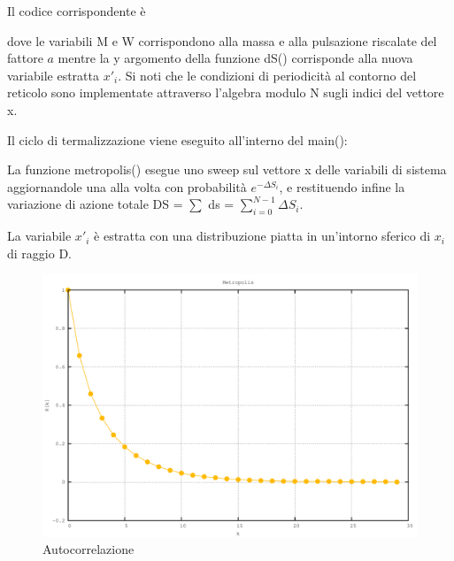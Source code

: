 \documentclass[a4paper,11pt]{report}
\begin{document}
Il codice corrispondente è

dove le variabili {\ttfamily M} e {\ttfamily W} corrispondono alla massa e alla pulsazione riscalate del fattore $a$ mentre la {\ttfamily y} argomento della funzione {\ttfamily dS()} corrisponde alla nuova variabile estratta $x'_{i}$. Si noti che le condizioni di periodicità al contorno del reticolo sono implementate attraverso l'algebra modulo N sugli indici del vettore {\ttfamily x}.

Il ciclo di termalizzazione viene eseguito all'interno del {\ttfamily main()}:

La funzione {\ttfamily metropolis()} esegue uno sweep sul vettore {\ttfamily x} delle variabili di sistema aggiornandole una alla volta con probabilità $e^{-\Delta S_i}$, e restituendo infine la variazione di azione totale {\ttfamily DS} = {\ttfamily $\sum$ ds} = $\sum^{N-1}_{i=0}\Delta S_i$.

La variabile $x'_i$ è estratta con una distribuzione piatta in un'intorno sferico di $x_i$ di raggio {\ttfamily D}.

\begin{figure}[h]
\centering
\includegraphics[width=\textwidth]{autocorrelation}
\caption{Autocorrelazione}
\label{fig:autocorrelation}
\end{figure}
\end{document}
